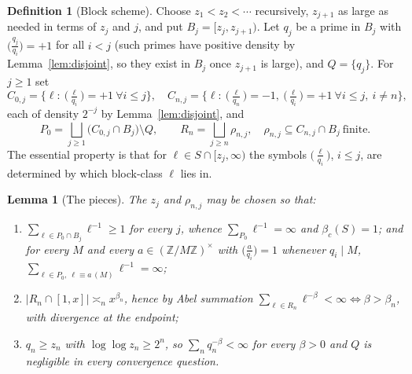 \documentclass[11pt]{amsart}
\numberwithin{equation}{section}
\newtheorem{lemma}[theorem]{Lemma}
\theoremstyle{definition}
\newtheorem{definition}[theorem]{Definition}
\theoremstyle{remark}
\newcommand{\Z}{\mathbb{Z}}
\begin{document}
\begin{definition}[Block scheme]\label{def:blocks}
Choose $z_1<z_2<\cdots$ recursively, $z_{j+1}$ as large as needed in terms of $z_j$ and $j$,
and put $B_j=[z_j,z_{j+1})$. Let $q_j$ be a prime in $B_j$ with $\bigl(\tfrac{q_j}{q_i}\bigr)=+1$
for all $i<j$ (such primes have positive density by Lemma~\ref{lem:disjoint}, so they exist in
$B_j$ once $z_{j+1}$ is large), and $Q=\{q_j\}$. For $j\ge1$ set
\[
C_{0,j}=\bigl\{\ell:\ \bigl(\tfrac{\ell}{q_i}\bigr)=+1\ \forall i\le j\bigr\},
\quad
C_{n,j}=\bigl\{\ell:\ \bigl(\tfrac{\ell}{q_n}\bigr)=-1,\ \bigl(\tfrac{\ell}{q_i}\bigr)=+1\ \forall i\le j,\ i\ne n\bigr\},
\]
each of density $2^{-j}$ by Lemma~\ref{lem:disjoint}, and
\[
P_0=\bigsqcup_{j\ge1}\bigl(C_{0,j}\cap B_j\bigr)\setminus Q,
\qquad
R_n=\bigsqcup_{j\ge n}\rho_{n,j},\quad \rho_{n,j}\subseteq C_{n,j}\cap B_j\ \text{finite}.
\]
The essential property is that for $\ell\in S\cap[z_j,\infty)$ the symbols
$\bigl(\tfrac{\ell}{q_i}\bigr)$, $i\le j$, are determined by which block-class $\ell$ lies
in.
\end{definition}

\begin{lemma}[The pieces]\label{lem:pieces}
The $z_j$ and $\rho_{n,j}$ may be chosen so that:
\begin{enumerate}
\item $\sum_{\ell\in P_0\cap B_j}\ell^{-1}\ge1$ for every $j$, whence
$\sum_{P_0}\ell^{-1}=\infty$ and $\beta_c(S)=1$; and for every $M$ and every
$a\in(\Z/M\Z)^\times$ with $\bigl(\tfrac{a}{q_i}\bigr)=1$ whenever $q_i\mid M$,
$\sum_{\ell\in P_0,\ \ell\equiv a\,(M)}\ell^{-1}=\infty$;
\item $|R_n\cap[1,x]|\asymp_nx^{\beta_n}$, hence by Abel summation
$\sum_{\ell\in R_n}\ell^{-\beta}<\infty\iff\beta>\beta_n$, with divergence at the endpoint;
\item $q_n\ge z_n$ with $\log\log z_n\ge2^n$, so $\sum_nq_n^{-\beta}<\infty$ for every
$\beta>0$ and $Q$ is negligible in every convergence question.
\end{enumerate}
\end{lemma}
\end{document}
